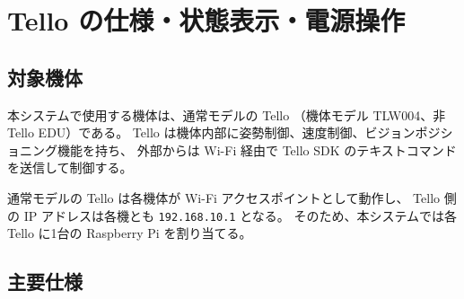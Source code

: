 \documentclass[11pt,a4paper]{ltjsarticle}
\newcommand{\code}[1]{\texttt{\small #1}}
\begin{document}
\section{Tello の仕様・状態表示・電源操作}
\label{sec:tello_spec}

\subsection{対象機体}

本システムで使用する機体は、通常モデルの Tello
（機体モデル TLW004、非 Tello EDU）である。
Tello は機体内部に姿勢制御、速度制御、ビジョンポジショニング機能を持ち、
外部からは Wi-Fi 経由で Tello SDK のテキストコマンドを送信して制御する。

通常モデルの Tello は各機体が Wi-Fi アクセスポイントとして動作し、
Tello 側の IP アドレスは各機とも \code{192.168.10.1} となる。
そのため、本システムでは各 Tello に1台の Raspberry Pi を割り当てる。

\subsection{主要仕様}
\end{document}
